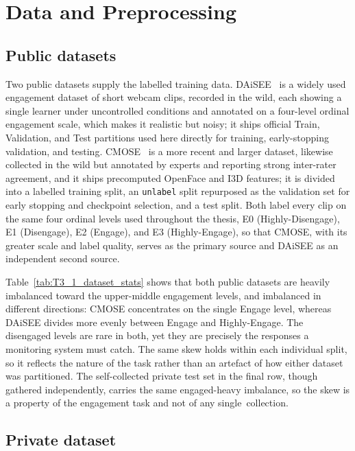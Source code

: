 \documentclass[../main.tex]{subfiles}
\begin{document}
\FloatBarrier
\section{Data and Preprocessing}
\label{sec:data}

\subsection{Public datasets}

Two public datasets supply the labelled training data. DAiSEE~\cite{daisee} is a widely used engagement dataset of short webcam clips, recorded in the wild, each showing a single learner under uncontrolled conditions and annotated on a four-level ordinal engagement scale, which makes it realistic but noisy; it ships official Train, Validation, and Test partitions used here directly for training, early-stopping validation, and testing. CMOSE~\cite{cmose} is a more recent and larger dataset, likewise collected in the wild but annotated by experts and reporting strong inter-rater agreement, and it ships precomputed OpenFace and I3D features; it is divided into a labelled training split, an \texttt{unlabel} split repurposed as the validation set for early stopping and checkpoint selection, and a test split. Both label every clip on the same four ordinal levels used throughout the thesis, E0 (Highly\nobreakdash-Disengage), E1 (Disengage), E2 (Engage), and E3 (Highly\nobreakdash-Engage), so that CMOSE, with its greater scale and label quality, serves as the primary source and DAiSEE as an independent second source.


Table~\ref{tab:T3_1_dataset_stats} shows that both public datasets are heavily imbalanced toward the upper-middle engagement levels, and imbalanced in different directions: CMOSE concentrates on the single Engage level, whereas DAiSEE divides more evenly between Engage and Highly\nobreakdash-Engage. The disengaged levels are rare in both, yet they are precisely the responses a monitoring system must catch. The same skew holds within each individual split, so it reflects the nature of the task rather than an artefact of how either dataset was partitioned. The self-collected private test set in the final row, though gathered independently, carries the same engaged-heavy imbalance, so the skew is a property of the engagement task and not of any single~collection.

\subsection{Private dataset}
\label{sec:private-collection}
\end{document}
